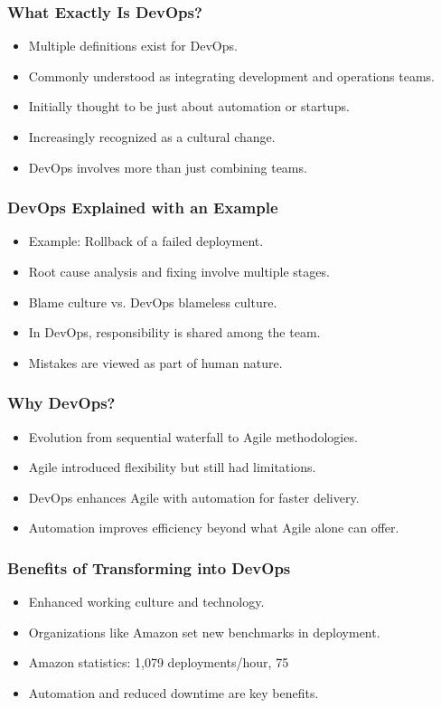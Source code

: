 \documentclass[aspectratio=169, table]{beamer}
\begin{document}
\begin{frame}
	\frametitle{What Exactly Is DevOps?}
	\begin{itemize}
		\item Multiple definitions exist for DevOps.
		\item Commonly understood as integrating development and operations teams.
		\item Initially thought to be just about automation or startups.
		\item Increasingly recognized as a cultural change.
		\item DevOps involves more than just combining teams.
	\end{itemize}
\end{frame}

\begin{frame}
	\frametitle{DevOps Explained with an Example}
	\begin{itemize}
		\item Example: Rollback of a failed deployment.
		\item Root cause analysis and fixing involve multiple stages.
		\item Blame culture vs. DevOps blameless culture.
		\item In DevOps, responsibility is shared among the team.
		\item Mistakes are viewed as part of human nature.
	\end{itemize}
\end{frame}

\begin{frame}
	\frametitle{Why DevOps?}
	\begin{itemize}
		\item Evolution from sequential waterfall to Agile methodologies.
		\item Agile introduced flexibility but still had limitations.
		\item DevOps enhances Agile with automation for faster delivery.
		\item Automation improves efficiency beyond what Agile alone can offer.
	\end{itemize}
\end{frame}

\begin{frame}
	\frametitle{Benefits of Transforming into DevOps}
	\begin{itemize}
		\item Enhanced working culture and technology.
		\item Organizations like Amazon set new benchmarks in deployment.
		\item Amazon statistics: 1,079 deployments/hour, 75%
		\item Automation and reduced downtime are key benefits.
	\end{itemize}
\end{frame}
\end{document}
